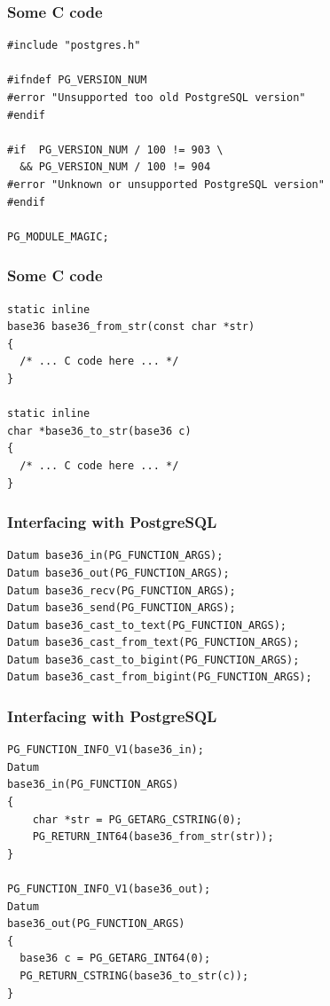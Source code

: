 \documentclass{beamer}
\begin{document}
\begin{frame}[fragile]
  \frametitle{Some C code}

\begin{verbatim}
#include "postgres.h"

#ifndef PG_VERSION_NUM
#error "Unsupported too old PostgreSQL version"
#endif

#if  PG_VERSION_NUM / 100 != 903 \
  && PG_VERSION_NUM / 100 != 904
#error "Unknown or unsupported PostgreSQL version"
#endif

PG_MODULE_MAGIC;
\end{verbatim}
\end{frame}

\begin{frame}[fragile]
  \frametitle{Some C code}

\begin{verbatim}
static inline
base36 base36_from_str(const char *str)
{
  /* ... C code here ... */
}

static inline
char *base36_to_str(base36 c)
{
  /* ... C code here ... */
}
\end{verbatim}
\end{frame}

\begin{frame}[fragile]
  \frametitle{Interfacing with PostgreSQL}

\begin{verbatim}
Datum base36_in(PG_FUNCTION_ARGS);
Datum base36_out(PG_FUNCTION_ARGS);
Datum base36_recv(PG_FUNCTION_ARGS);
Datum base36_send(PG_FUNCTION_ARGS);
Datum base36_cast_to_text(PG_FUNCTION_ARGS);
Datum base36_cast_from_text(PG_FUNCTION_ARGS);
Datum base36_cast_to_bigint(PG_FUNCTION_ARGS);
Datum base36_cast_from_bigint(PG_FUNCTION_ARGS);
\end{verbatim}
\end{frame}

\begin{frame}[fragile]
  \frametitle{Interfacing with PostgreSQL}

\begin{verbatim}
PG_FUNCTION_INFO_V1(base36_in);
Datum
base36_in(PG_FUNCTION_ARGS)
{
    char *str = PG_GETARG_CSTRING(0);
    PG_RETURN_INT64(base36_from_str(str));
}

PG_FUNCTION_INFO_V1(base36_out);
Datum
base36_out(PG_FUNCTION_ARGS)
{
  base36 c = PG_GETARG_INT64(0);
  PG_RETURN_CSTRING(base36_to_str(c));
}
\end{verbatim}
\end{frame}
\end{document}
